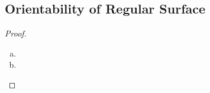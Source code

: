 \documentclass[pdftex, 12pt]{report}%
\begin{document}
{

\subsection{Orientability of Regular Surface}

\newcommand*{\x}{\mathbf{x}}
\newcommand*{\y}{\mathbf{y}}
\newcommand*{\z}{\mathbf{z}}
\newcommand*{\iso}[1]{\stackrel{\mathrm{#1.}}{\cong}}

\begin{proof}
\begin{enumerate}[(a)]
	\item
	\item
\end{enumerate}
\end{proof}

}
\end{document}
